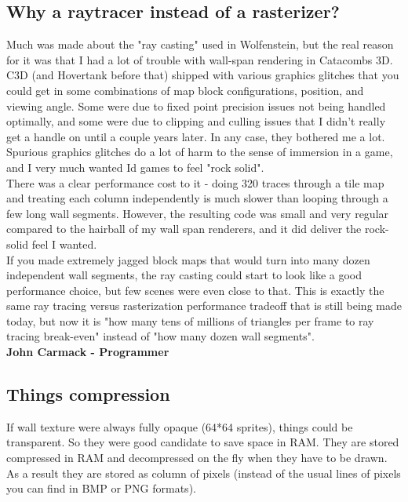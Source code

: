 \subsection{Why a raytracer instead of a rasterizer?} 
\begin{fancyquotes}
Much was made about the "ray casting" used in Wolfenstein, but the real reason for it was that I had a lot of trouble with wall-span rendering in Catacombs 3D.  C3D (and Hovertank before that) shipped with various graphics glitches that you could get in some combinations of map block configurations, position, and viewing angle.  Some were due to fixed point precision issues not being handled optimally, and some were due to clipping and culling issues that I didn't really get a handle on until a couple years later.  In any case, they bothered me a lot.  Spurious graphics glitches do a lot of harm to the sense of immersion in a game, and I very much wanted Id games to feel "rock solid".
 \bigskip \\
There was a clear performance cost to it - doing 320 traces through a tile map and treating each column independently is much slower than looping through a few long wall segments.  However, the resulting code was small and very regular compared to the hairball of my wall span renderers, and it did deliver the rock-solid feel I wanted.
 \bigskip \\
If you made extremely jagged block maps that would turn into many dozen independent wall segments, the ray casting could start to look like a good performance choice, but few scenes were even close to that.  This is exactly the same ray tracing versus rasterization performance tradeoff that is still being made today, but now it is "how many tens of millions of triangles per frame to ray tracing break-even" instead of "how many dozen wall segments".
 \bigskip \\
\textbf{John Carmack - Programmer}
 \end{fancyquotes}
 
 
 
 
 
 
 
 \subsection{Things compression}
 If wall texture were always fully opaque (64*64 sprites), things could be transparent. So they were good candidate to save space in RAM. They are stored compressed in RAM and decompressed on the fly when they have to be drawn. As a result they are stored as column of pixels (instead of the usual lines of pixels you can find in BMP or PNG formats).
 
